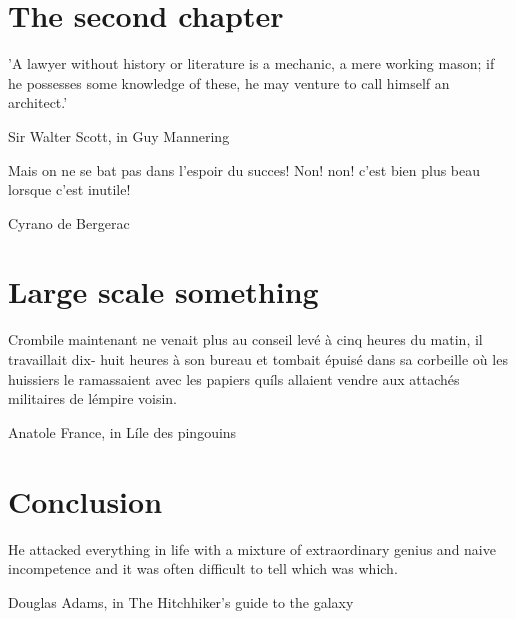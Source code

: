 \documentclass{ucbthesis}
\begin{document}
\chapter{The second chapter}
\epigraph{'A lawyer without history or literature is a mechanic, a mere working mason; if he possesses some knowledge of these, he may venture to call himself an architect.'}{Sir Walter Scott, in Guy Mannering}




\epigraph{Mais on ne se bat pas dans l'espoir du succes! Non! non! c'est bien plus beau lorsque c'est inutile!}{Cyrano de Bergerac}




% 

\chapter{Large scale something}
\epigraph{Crombile maintenant ne venait plus au conseil\; levé à cinq heures du matin, 
il travaillait dix- huit heures à son bureau et tombait épuisé dans sa corbeille où les huissiers 
le ramassaient avec les papiers qu\'ils allaient vendre 
aux attachés militaires de l\'empire voisin.}{Anatole France, in L\'ile des pingouins}







\chapter{Conclusion}
\epigraph{He attacked everything in life with a mixture of extraordinary genius and naive incompetence and it was often difficult to tell which was which.}{Douglas Adams, in The Hitchhiker's guide to the galaxy}

\printbibliography
\end{document}
